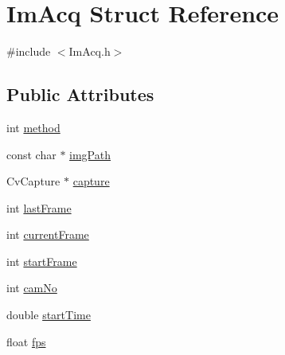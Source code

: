 \hypertarget{struct_im_acq}{
\section{ImAcq Struct Reference}
\label{struct_im_acq}
}


{\ttfamily \#include $<$ImAcq.h$>$}

\subsection*{Public Attributes}
\begin{DoxyCompactItemize}
\item 
int \hyperlink{struct_im_acq_a338a470fffa65fbfb9fade98a8fc12ca}{method}
\item 
const char $\ast$ \hyperlink{struct_im_acq_ae389de4997bf71e132171734a7d627eb}{imgPath}
\item 
CvCapture $\ast$ \hyperlink{struct_im_acq_a71a1e8a55bfdf429634751a597a6dcba}{capture}
\item 
int \hyperlink{struct_im_acq_a0afeeee09d54a896433376cf359d209f}{lastFrame}
\item 
int \hyperlink{struct_im_acq_a0be9cca3c7dbda6da3ce2752717ce885}{currentFrame}
\item 
int \hyperlink{struct_im_acq_a1f52cf31c1f19f27846d481654a370e2}{startFrame}
\item 
int \hyperlink{struct_im_acq_a9c151285da789cd035360b34d9637831}{camNo}
\item 
double \hyperlink{struct_im_acq_a6a4ccba3d36d599a7902a943f1f6a08c}{startTime}
\item 
float \hyperlink{struct_im_acq_ac17ac96f1bb1ef278a70eeaec6e0275f}{fps}
\end{DoxyCompactItemize}


